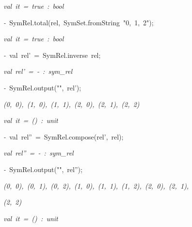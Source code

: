 \begin{list}{}
\item[]\textsl{val\ it\ =\ true\ :\ bool}
\item[]\textsl{-\ }SymRel.total(rel,\ SymSet.fromString\ "0,\ 1,\ 2");
\item[]\textsl{val\ it\ =\ true\ :\ bool}
\item[]\textsl{-\ }val\ rel'\ =\ SymRel.inverse\ rel;
\item[]\textsl{val\ rel'\ =\ -\ :\ sym_rel}
\item[]\textsl{-\ }SymRel.output("",\ rel');
\item[]\textsl{(0,\ 0),\ (1,\ 0),\ (1,\ 1),\ (2,\ 0),\ (2,\ 1),\ (2,\ 2)}
\item[]\textsl{val\ it\ =\ ()\ :\ unit}
\item[]\textsl{-\ }val\ rel''\ =\ SymRel.compose(rel',\ rel);
\item[]\textsl{val\ rel''\ =\ -\ :\ sym_rel}
\item[]\textsl{-\ }SymRel.output("",\ rel'');
\item[]\textsl{(0,\ 0),\ (0,\ 1),\ (0,\ 2),\ (1,\ 0),\ (1,\ 1),\ (1,\ 2),\ (2,\ 0),\ (2,\ 1),}
\item[]\textsl{(2,\ 2)}
\item[]\textsl{val\ it\ =\ ()\ :\ unit}
\end{list}
